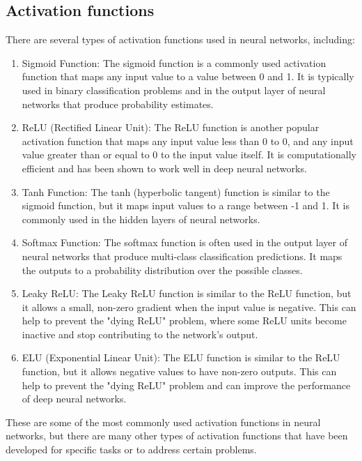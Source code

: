     \subsection{Activation functions} \label{subsec:nnaf}
    There are several types of activation functions used in neural networks, including:
    \begin{enumerate}
        \item Sigmoid Function: The sigmoid function is a commonly used activation function that maps any input value to a value between 0 and 1.
        It is typically used in binary classification problems and in the output layer of neural networks that produce probability estimates.
        \item ReLU (Rectified Linear Unit): The ReLU function is another popular activation function that maps any input value less than 0 to 0, and any
        input value greater than or equal to 0 to the input value itself. It is computationally efficient and has been shown to work
        well in deep neural networks.
        \item Tanh Function: The tanh (hyperbolic tangent) function is similar to the sigmoid function, but it maps input values to a range
        between -1 and 1. It is commonly used in the hidden layers of neural networks.
        \item Softmax Function: The softmax function is often used in the output layer of neural networks that produce multi-class
        classification predictions. It maps the outputs to a probability distribution over the possible classes.
        \item Leaky ReLU: The Leaky ReLU function is similar to the ReLU function, but it allows a small, non-zero gradient when the input
        value is negative. This can help to prevent the "dying ReLU" problem, where some ReLU units become inactive and stop
        contributing to the network's output.
        \item ELU (Exponential Linear Unit): The ELU function is similar to the ReLU function, but it allows negative values to have non-zero outputs.
        This can help to prevent the "dying ReLU" problem and can improve the performance of deep neural networks.
    \end{enumerate}
    These are some of the most commonly used activation functions in neural networks, but there are many other types of activation
    functions that have been developed for specific tasks or to address certain problems.

